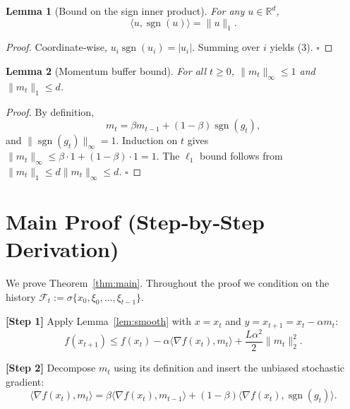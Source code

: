 \documentclass[11pt]{article}
\newtheorem{lemma}{Lemma}[section]
\begin{document}
\begin{lemma}[Bound on the sign inner product]\label{lem:sign}
For any $u\in\mathbb{R}^{d}$,
\[
    \langle u, \operatorname{sgn}(u)\rangle = \|u\|_{1}. \tag{3}
\]
\end{lemma}
\begin{proof}
Coordinate‑wise, $u_{i}\operatorname{sgn}(u_{i})=|u_{i}|$. Summing over $i$ yields (3). \hfill $\square$
\end{proof}

\begin{lemma}[Momentum buffer bound]\label{lem:momentum}
For all $t\ge0$, $\|m_{t}\|_{\infty}\le 1$ and $\|m_{t}\|_{1}\le d$.
\end{lemma}
\begin{proof}
By definition,
\[
    m_{t}= \beta m_{t-1}+(1-\beta)\operatorname{sgn}(g_{t}),
\]
and $\|\operatorname{sgn}(g_{t})\|_{\infty}=1$. Induction on $t$ gives $\|m_{t}\|_{\infty}\le\beta\cdot1+(1-\beta)\cdot1=1$. The $\ell_{1}$ bound follows from $\|m_{t}\|_{1}\le d\|m_{t}\|_{\infty}\le d$. \hfill $\square$
\end{proof}

\section*{Main Proof (Step‑by‑Step Derivation)}
We prove Theorem~\ref{thm:main}. Throughout the proof we condition on the history $\mathcal{F}_{t}:=\sigma\{x_{0},\xi_{0},\dots,\xi_{t-1}\}$.

\bigskip
\noindent\textbf{[Step 1]} Apply Lemma~\ref{lem:smooth} with $x=x_{t}$ and $y=x_{t+1}=x_{t}-\alpha m_{t}$:
\[
    f(x_{t+1}) \le f(x_{t}) -\alpha\langle \nabla f(x_{t}), m_{t}\rangle + \frac{L\alpha^{2}}{2}\|m_{t}\|_{2}^{2}. \tag{4}
\]

\noindent\textbf{[Step 2]} Decompose $m_{t}$ using its definition and insert the unbiased stochastic gradient:
\[
    \langle \nabla f(x_{t}), m_{t}\rangle
    =\beta\langle \nabla f(x_{t}), m_{t-1}\rangle
      +(1-\beta)\langle \nabla f(x_{t}),\operatorname{sgn}(g_{t})\rangle .
\tag{5}
\]
\end{document}
